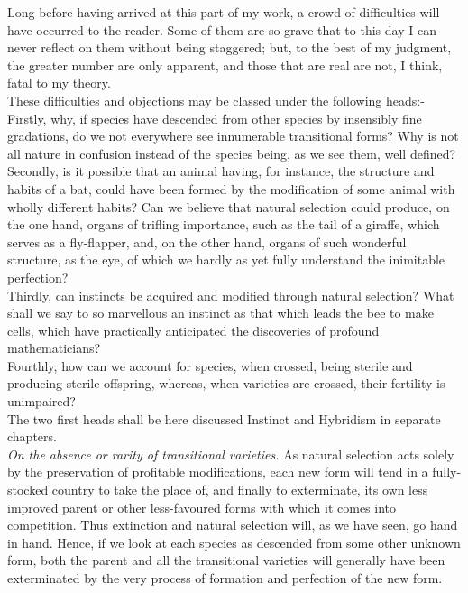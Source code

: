 \indent Long before having arrived at this part of my work, a crowd of difficulties will have occurred to the reader. Some of them are so grave that to this day I can never reflect on them without being staggered; but, to the best of my judgment, the greater number are only apparent, and those that are real are not, I think, fatal to my theory.\\
\indent These difficulties and objections may be classed under the following heads:-Firstly, why, if species have descended from other species by insensibly fine gradations, do we not everywhere see innumerable transitional forms? Why is not all nature in confusion instead of the species being, as we see them, well defined?\\
\indent Secondly, is it possible that an animal having, for instance, the structure and habits of a bat, could have been formed by the modification of some animal with wholly different habits? Can we believe that natural selection could produce, on the one hand, organs of trifling importance, such as the tail of a giraffe, which serves as a fly-flapper, and, on the other hand, organs of such wonderful structure, as the eye, of which we hardly as yet fully understand the inimitable perfection?\\
\indent Thirdly, can instincts be acquired and modified through natural selection? What shall we say to so marvellous an instinct as that which leads the bee to make cells, which have practically anticipated the discoveries of profound mathematicians?\\
\indent Fourthly, how can we account for species, when crossed, being sterile and producing sterile offspring, whereas, when varieties are crossed, their fertility is unimpaired?\\
\indent The two first heads shall be here discussed Instinct and Hybridism in separate chapters.\\
\indent \emph{On the absence or rarity of transitional varieties.} As natural selection acts solely by the preservation of profitable modifications, each new form will tend in a fully-stocked country to take the place of, and finally to exterminate, its own less improved parent or other less-favoured forms with which it comes into competition. Thus extinction and natural selection will, as we have seen, go hand in hand. Hence, if we look at each species as descended from some other unknown form, both the parent and all the transitional varieties will generally have been exterminated by the very process of formation and perfection of the new form.\\
